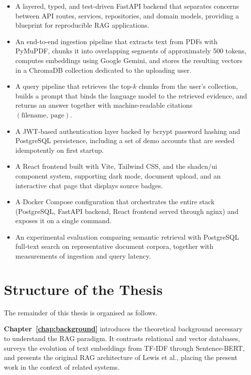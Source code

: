 \begin{itemize}
  \item A layered, typed, and test-driven FastAPI backend that separates
        concerns between API routes, services, repositories, and domain
        models, providing a blueprint for reproducible RAG applications.
  \item An end-to-end ingestion pipeline that extracts text from PDFs with
        PyMuPDF, chunks it into overlapping segments of approximately 500
        tokens, computes embeddings using Google Gemini, and stores the
        resulting vectors in a ChromaDB collection dedicated to the
        uploading user.
  \item A query pipeline that retrieves the top-$k$ chunks from the user's
        collection, builds a prompt that binds the language model to the
        retrieved evidence, and returns an answer together with
        machine-readable citations $(\text{filename},\ \text{page})$.
  \item A JWT-based authentication layer backed by bcrypt password hashing
        and PostgreSQL persistence, including a set of demo accounts that
        are seeded idempotently on first startup.
  \item A React frontend built with Vite, Tailwind CSS, and the shadcn/ui
        component system, supporting dark mode, document upload, and an
        interactive chat page that displays source badges.
  \item A Docker Compose configuration that orchestrates the entire stack
        (PostgreSQL, FastAPI backend, React frontend served through nginx)
        and exposes it on a single command.
  \item An experimental evaluation comparing semantic retrieval with
        PostgreSQL full-text search on representative document corpora,
        together with measurements of ingestion and query latency.
\end{itemize}

\section{Structure of the Thesis}
\label{sec:structure}

The remainder of this thesis is organised as follows.

\textbf{Chapter~\ref{chap:background}} introduces the theoretical background
necessary to understand the RAG paradigm. It contrasts relational and vector
databases, surveys the evolution of text embeddings from TF-IDF through
Sentence-BERT, and presents the original RAG architecture of Lewis et al.,
placing the present work in the context of related systems.

